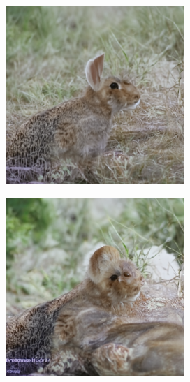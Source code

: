 \documentclass{article}
\begin{document}
\begin{figure}
    \begin{subfigure}[b]{0.19\linewidth}
    \includegraphics[width=\linewidth]{figures/imagenet256/solver_samples/imagenet256_fm_ot_08_05.png}
    \end{subfigure}
    \begin{subfigure}[b]{0.19\linewidth}
    \includegraphics[width=\linewidth]{figures/imagenet256/solver_samples/imagenet256_fm_ot_08_10.png}

\end{subfigure}
\end{figure}
\end{document}

